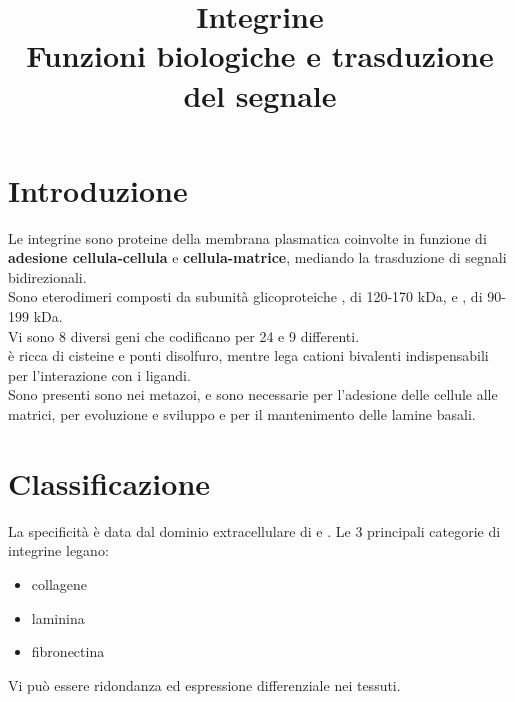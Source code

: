 \documentclass[a4paper, 12pt]{article}
\date{}
\title{%
  Integrine \\
  \large Funzioni biologiche e trasduzione del segnale
}
\begin{document}
\maketitle

\section{Introduzione}
Le integrine sono proteine della membrana plasmatica coinvolte in funzione di \textbf{adesione cellula-cellula} e \textbf{cellula-matrice}, mediando la trasduzione di segnali bidirezionali.\\
Sono eterodimeri composti da subunità glicoproteiche {\textalpha}, di 120-170 kDa, e {\textbeta}, di 90-199 kDa.\\
Vi sono 8 diversi geni che codificano per 24 {\textalpha} e 9 {\textbeta} differenti.\\
{\textbeta} è ricca di cisteine e ponti disolfuro, mentre {\textalpha} lega cationi bivalenti indispensabili per l'interazione con i ligandi.\\
Sono presenti sono nei metazoi, e sono necessarie per l'adesione delle cellule alle matrici, per evoluzione e sviluppo e per il mantenimento delle lamine basali.

\section{Classificazione}
La specificità è data dal dominio extracellulare di {\textalpha} e {\textbeta}. Le 3 principali categorie di integrine legano:
\begin{itemize}
  \item collagene
  \item laminina
  \item fibronectina
\end{itemize}
Vi può essere ridondanza ed espressione differenziale nei tessuti.
\end{document}
